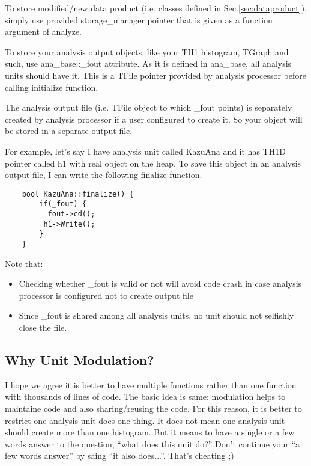 To store modified/new data product (i.e. classes defined in Sec.\ref{sec:dataproduct}), simply use provided {\ttfamily storage\_manager} pointer that is given as a function argument of {\ttfamily analyze}. 

To store your analysis output \ROOT objects, like your {\ttfamily TH1} histogram, {\ttfamily TGraph} and such, use {\ttfamily ana\_base::\_fout} attribute. As it is defined in {\ttfamily ana\_base}, all analysis units should have it. This is a {\ttfamily TFile} pointer provided by analysis processor before calling {\ttfamily initialize} function. 

The analysis output file (i.e. {\ttfamily TFile} object to which {\ttfamily \_fout} points) is separately created by analysis processor if a user configured to create it. So your object will be stored in a separate output \ROOT file.

For example, let's say I have analysis unit called {\ttfamily KazuAna} and it has {\ttfamily TH1D} pointer called {\ttfamily h1} with real object on the heap. To save this object in an analysis output file, I can write the following {\ttfamily finalize} function.
\begin{lstlisting}
    bool KazuAna::finalize() {
        if(_fout) {
         _fout->cd();
         h1->Write();
        }
    }
\end{lstlisting}
Note that:
\begin{itemize}
\item Checking whether {\ttfamily \_fout} is valid or not will avoid code crash in case analysis processor is configured not to create output file
\item Since {\ttfamily \_fout} is shared among all analysis units, no unit should not selfishly close the file.
\end{itemize}


\subsection{Why Unit Modulation?}
I hope we agree it is better to have multiple functions rather than one function with thousands of lines of code. 
The basic idea is same: modulation helps to maintaine code and also sharing/reusing the code.
For this reason, it is better to restrict one analysis unit does one thing.
It does not mean one analysis unit should create more than one histogram. 
But it means to have a single or a few words answer to the question, ``what does this unit do?''
Don't continue your ``a few words answer'' by saing ``it also does...''. That's cheating ;)

